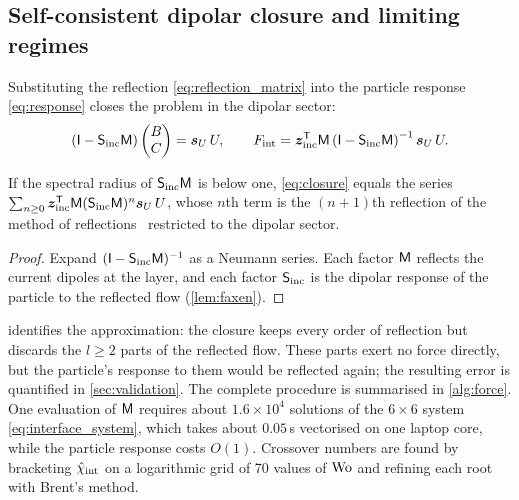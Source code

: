 \subsection{Self-consistent dipolar closure and limiting regimes}\label{sec:closure}
Substituting the reflection \eqref{eq:reflection_matrix} into the particle response \eqref{eq:response} closes the
problem in the dipolar sector:
\begin{equation}
  \left(\mathsf I-\mathsf S_{\rm inc}\mathsf{M}\right)\begin{pmatrix}B\\ C\end{pmatrix}=\bm s_U\,U,
  \qquad
  F_{\rm int}=\bm z_{\rm inc}^{\mathsf T}\mathsf{M}\left(\mathsf I-\mathsf S_{\rm inc}\mathsf{M}\right)^{-1}\bm s_U\,U .
  \label{eq:closure}
\end{equation}
\begin{proposition}\label{prop:series}
If the spectral radius of $\mathsf S_{\rm inc}\mathsf{M}$ is below one, \cref{eq:closure} equals the series
$\sum_{n\ge0}\bm z_{\rm inc}^{\mathsf T}\mathsf{M}(\mathsf S_{\rm inc}\mathsf{M})^n\bm s_U\,U$, whose $n$th term is the $(n+1)$th
reflection of the method of reflections~\cite{simha2018unsteady} restricted to the dipolar sector.
\end{proposition}
\begin{proof}
Expand $(\mathsf I-\mathsf S_{\rm inc}\mathsf{M})^{-1}$ as a Neumann series. Each factor $\mathsf{M}$ reflects the current dipoles at
the layer, and each factor $\mathsf S_{\rm inc}$ is the dipolar response of the particle to the reflected flow
(\cref{lem:faxen}).
\end{proof}

 identifies the approximation: the closure keeps every order of reflection but discards the $l\ge2$
parts of the reflected flow. These parts exert no force directly, but the particle's response to them would be
reflected again; the resulting error is quantified in \cref{sec:validation}. The complete procedure is summarised in
\cref{alg:force}. One evaluation of $\mathsf{M}$ requires about $1.6\times10^4$ solutions of the $6\times6$ system
\eqref{eq:interface_system}, which takes about $0.05$\,s vectorised on one laptop core, while the particle response costs
$O(1)$. Crossover numbers are found by bracketing $\hat\chi_{\rm int}$ on a logarithmic grid of 70 values of $\mathrm{Wo}$ and
refining each root with Brent's method.


